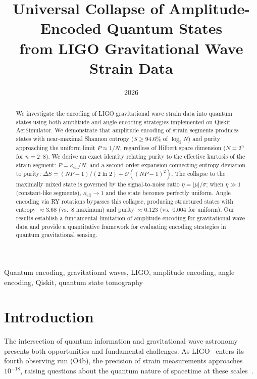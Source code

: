 \documentclass[conference]{IEEEtran}
\begin{document}
\title{Universal Collapse of Amplitude-Encoded Quantum States \\ from LIGO Gravitational Wave Strain Data}

\author{
}
\date{2026}

\maketitle

\begin{abstract}
We investigate the encoding of LIGO gravitational wave strain data into quantum states using both amplitude and angle encoding strategies implemented on Qiskit AerSimulator. We demonstrate that amplitude encoding of strain segments produces states with near-maximal Shannon entropy ($S \geq 94.6\%$ of $\log_2 N$) and purity approaching the uniform limit $P \approx 1/N$, regardless of Hilbert space dimension ($N = 2^n$ for $n = 2$--$8$). We derive an exact identity relating purity to the effective kurtosis of the strain segment: $P = \kappa_{\text{eff}} / N$, and a second-order expansion connecting entropy deviation to purity: $\Delta S = (N P - 1) / (2 \ln 2) + \mathcal{O}((N P - 1)^2)$. The collapse to the maximally mixed state is governed by the signal-to-noise ratio $\eta = |\mu|/\sigma$; when $\eta \gg 1$ (constant-like segments), $\kappa_{\text{eff}} \to 1$ and the state becomes perfectly uniform. Angle encoding via RY rotations bypasses this collapse, producing structured states with entropy $\approx 3.68$ (vs.\ $8$ maximum) and purity $\approx 0.123$ (vs.\ $0.004$ for uniform). Our results establish a fundamental limitation of amplitude encoding for gravitational wave data and provide a quantitative framework for evaluating encoding strategies in quantum gravitational sensing.
\end{abstract}

\begin{IEEEkeywords}
Quantum encoding, gravitational waves, LIGO, amplitude encoding, angle encoding, Qiskit, quantum state tomography
\end{IEEEkeywords}

\section{Introduction}

The intersection of quantum information and gravitational wave astronomy presents both opportunities and fundamental challenges. As LIGO~\cite{ligo2015} enters its fourth observing run (O4b), the precision of strain measurements approaches $10^{-18}$, raising questions about the quantum nature of spacetime at these scales~\cite{verlinde2011, hossenfelder2013}.
\end{document}
